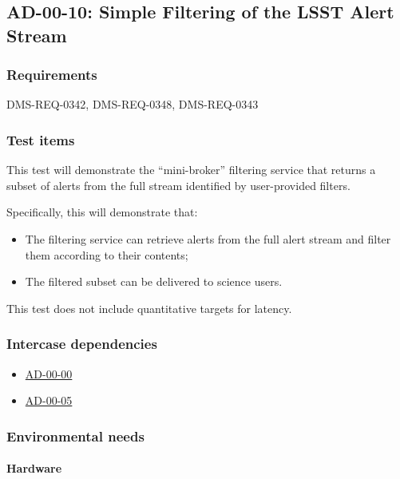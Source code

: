\subsection{AD-00-10: Simple Filtering of the LSST Alert Stream}
\label{ad-00-10}

\subsubsection{Requirements}

DMS-REQ-0342, DMS-REQ-0348, DMS-REQ-0343

\subsubsection{Test items}
\label{ag-00-10-items}

This test will demonstrate the ``mini-broker'' filtering service that returns a subset of alerts from the full stream identified by user-provided filters.

Specifically, this will demonstrate that:

\begin{itemize}

	\item{The filtering service can retrieve alerts from the full alert stream and filter them according to their contents;}
	\item{The filtered subset can be delivered to science users.}

\end{itemize}

This test does not include quantitative targets for latency.

\subsubsection{Intercase dependencies}

\begin{itemize}

  \item{\hyperref[ad-00-00]{AD-00-00}}
  \item{\hyperref[ad-00-05]{AD-00-05}}

\end{itemize}

\subsubsection{Environmental needs}

\paragraph{Hardware}

